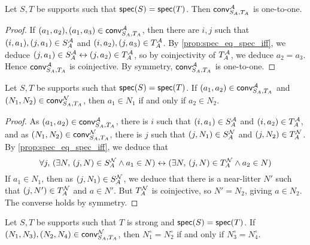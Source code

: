 \begin{proposition}
  \label{prop:conv_one_to_one}
  Let \( S, T \) be supports such that \( \operatorname{\mathsf{spec}}(S) = \operatorname{\mathsf{spec}}(T) \).
  Then \( \operatorname{\mathsf{conv}}_{S_A, T_A}^{\mathcal A} \) is one-to-one.
\end{proposition}
\begin{proof}
  If \( (a_1, a_2), (a_1, a_3) \in \operatorname{\mathsf{conv}}_{S_A, T_A}^{\mathcal A} \), then there are \( i, j \) such that \( (i, a_1), (j, a_1) \in S_A^{\mathcal A} \) and \( (i, a_2), (j, a_3) \in T_A^{\mathcal A} \).
  By \cref{prop:spec_eq_spec_iff}, we deduce \( (j, a_1) \in S_A^{\mathcal A} \leftrightarrow (j, a_2) \in T_A^{\mathcal A} \), so by coinjectivity of \( T_A^{\mathcal A} \), we deduce \( a_2 = a_3 \).
  Hence \( \operatorname{\mathsf{conv}}_{S_A, T_A}^{\mathcal A} \) is coinjective.
  By symmetry, \( \operatorname{\mathsf{conv}}_{S_A, T_A}^{\mathcal A} \) is one-to-one.
\end{proof}
\begin{proposition}
  \label{prop:conv_mem_nearLitter_iff}
  Let \( S, T \) be supports such that \( \operatorname{\mathsf{spec}}(S) = \operatorname{\mathsf{spec}}(T) \).
  If \( (a_1, a_2) \in \operatorname{\mathsf{conv}}_{S_A, T_A}^{\mathcal A} \) and \( (N_1, N_2) \in \operatorname{\mathsf{conv}}_{S_A, T_A}^{\mathcal N} \), then \( a_1 \in N_1 \) if and only if \( a_2 \in N_2 \).
\end{proposition}
\begin{proof}
  As \( (a_1, a_2) \in \operatorname{\mathsf{conv}}_{S_A, T_A}^{\mathcal A} \), there is \( i \) such that \( (i, a_1) \in S_A^{\mathcal A} \) and \( (i, a_2) \in T_A^{\mathcal A} \), and as \( (N_1, N_2) \in \operatorname{\mathsf{conv}}_{S_A, T_A}^{\mathcal N} \), there is \( j \) such that \( (j, N_1) \in S_A^{\mathcal N} \) and \( (j, N_2) \in T_A^{\mathcal N} \).
  By \cref{prop:spec_eq_spec_iff}, we deduce that
  \[ \forall j,\, (\exists N,\, (j, N) \in S_A^{\mathcal N} \wedge a_1 \in N) \leftrightarrow (\exists N,\, (j, N) \in T_A^{\mathcal N} \wedge a_2 \in N) \]
  If \( a_1 \in N_1 \), then as \( (j, N_1) \in S_A^{\mathcal N} \), we deduce that there is a near-litter \( N' \) such that \( (j, N') \in T_A^{\mathcal N} \) and \( a \in N' \).
  But \( T_A^{\mathcal N} \) is coinjective, so \( N' = N_2 \), giving \( a \in N_2 \).
  The converse holds by symmetry.
\end{proof}
\begin{proposition}
  \label{prop:conv_circ_eq_circ_iff}
  Let \( S, T \) be supports such that \( T \) is strong and \( \operatorname{\mathsf{spec}}(S) = \operatorname{\mathsf{spec}}(T) \).
  If \( (N_1, N_3), (N_2, N_4) \in \operatorname{\mathsf{conv}}_{S_A, T_A}^{\mathcal N} \), then \( N_1^\circ = N_2^\circ \) if and only if \( N_3^\circ = N_4^\circ \).
\end{proposition}
